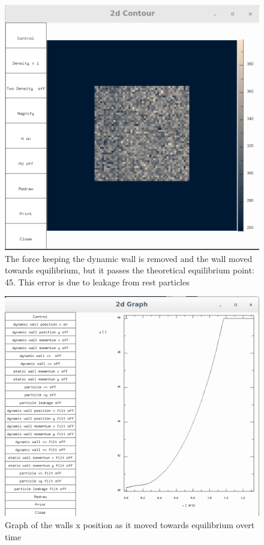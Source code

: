 \documentclass{article}
\begin{document}
\begin{figure}[H]
\includegraphics[scale=0.2]{A1p3.png}
\caption{\label{fig} The force keeping the dynamic wall is removed and the wall moved towards equilibrium, but it passes the theoretical equilibrium point: 45. This error is due to leakage from rest particles}
\end{figure}

\begin{figure}[H]
\includegraphics[scale=0.2]{A1p4.png}
\caption{\label{fig} Graph of the walls x position as it moved towards equilibrium overt time}
\end{figure}
\end{document}
